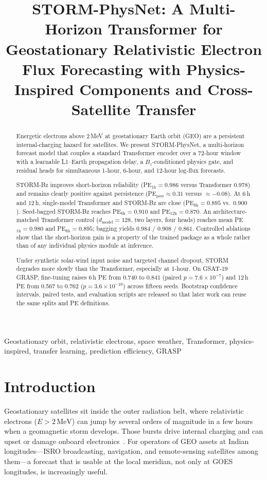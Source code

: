 \documentclass[conference]{IEEEtran}
\title{STORM-PhysNet: A Multi-Horizon Transformer for Geostationary Relativistic Electron Flux Forecasting with Physics-Inspired Components and Cross-Satellite Transfer}
\author{
\IEEEauthorblockN{Samarth BN}
\IEEEauthorblockA{BE in Electronics and Communication\\
RV College of Engineering, Bengaluru, India\\
Email: samarthbn.ec25@rvce.edu.in}
}
\begin{document}
\maketitle

\begin{abstract}
Energetic electrons above 2\,MeV at geostationary Earth orbit (GEO)
are a persistent internal-charging hazard for satellites. We present
STORM-PhysNet, a multi-horizon forecast model that couples a standard
Transformer encoder over a 72-hour window with a learnable L1--Earth
propagation delay, a \(B_z\)-conditioned physics gate, and residual
heads for simultaneous 1-hour, 6-hour, and 12-hour log-flux
forecasts.

STORM-Bz improves short-horizon reliability
(PE$_{1\mathrm{h}}=0.986$ versus Transformer $0.978$)
and remains clearly positive against persistence
(PE$_{\mathrm{pers}}\approx0.31$ versus $\approx-0.08$).
At 6\,h and 12\,h, single-model Transformer and STORM-Bz are close
(PE$_{6\mathrm{h}}=0.895$ vs.\ $0.900$).
Seed-bagged STORM-Bz reaches PE$_{6\mathrm{h}}=0.910$ and PE$_{12\mathrm{h}}=0.870$.
An architecture-matched Transformer control
($d_{\mathrm{model}}=128$, two layers, four heads)
reaches mean PE$_{1\mathrm{h}}=0.980$ and PE$_{6\mathrm{h}}=0.895$;
bagging yields $0.984$ / $0.908$ / $0.861$.
Controlled ablations show that the short-horizon gain is a property of the trained package
as a whole rather than of any individual physics module at inference.

Under synthetic solar-wind input noise and targeted channel dropout,
STORM degrades more slowly than the Transformer, especially at
1-hour. On GSAT-19 GRASP, fine-tuning raises 6\,h PE from
0.740 to 0.841 (paired \(p = 7.6\times10^{-7}\)) and 12\,h PE from
0.567 to 0.762 (\(p = 3.6\times10^{-10}\)) across fifteen seeds.
Bootstrap confidence intervals, paired tests, and evaluation scripts
are released so that later work can reuse the same splits and PE
definitions.
\end{abstract}

\begin{IEEEkeywords}
Geostationary orbit, relativistic electrons, space weather, Transformer,
physics-inspired, transfer learning, prediction efficiency, GRASP
\end{IEEEkeywords}

\section{Introduction}
Geostationary satellites sit inside the outer radiation belt, where
relativistic electrons (\(E>2\,\mathrm{MeV}\)) can jump by several orders of
magnitude in a few hours when a geomagnetic storm develops. Those bursts drive
internal charging and can upset or damage onboard electronics~\cite{b1,b2}.
For operators of GEO assets at Indian longitudes---ISRO broadcasting,
navigation, and remote-sensing satellites among them---a forecast that is
usable at the local meridian, not only at GOES longitudes, is increasingly
useful.
\end{document}
